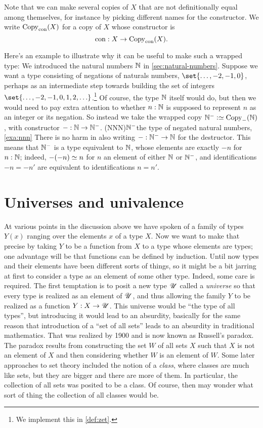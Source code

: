 Note that we can make several copies of $X$ that are not
definitionally equal among themselves,
for instance by picking different names for the constructor.
We write $\Copy_{\constructor{con}}(X)$ for a copy of $X$
whose constructor is
\[
  \constructor{con} : X \to \Copy_{\constructor{con}}(X).
\]

\begin{example}\label{exa:nnn}
Here's an example to illustrate why it can be useful to make such a wrapped type:
We introduced the natural numbers $\mathbb{N}$ in \cref{sec:natural-numbers}.
Suppose we want a type consisting of negations of naturals numbers,
$\set{\ldots, -2, -1,0}$,
perhaps as an intermediate step towards building the set of integers
$\set{\ldots, -2, -1,0,1,2,\ldots}$.\footnote{%
  We implement this in \cref{def:zet}.}
Of course, the type $\mathbb{N}$ itself would do,
but then we would need to pay extra attention to whether $n:\mathbb{N}$
is supposed to represent $n$ as an integer or its negation.
So instead we take the wrapped copy $\NNN\defeq\Copy_{-}(\NN)$,
with constructor ${-} : \mathbb{N} \to \mathbb{N}^{-}$.%
\glossary(NNN){$\protect\mathbb{N}^{-}$}{the type of negated natural numbers,
  \cref{exa:nnn}}
There is no harm in also writing ${-} : \mathbb{N}^{-} \to \mathbb{N}$
for the destructor.
This means that $\mathbb{N}^{-}$ is a type equivalent to $\mathbb{N}$,
whose elements are exactly $-n$ for $n:\mathbb{N}$;
indeed, $-(-n) \jdeq n$ for $n$ an element of either $\mathbb{N}$ or $\mathbb{N}^{-}$,
and identifications $-n = -n'$ are equivalent to
identifications $n=n'$.
\end{example}

\section{Universes and univalence}\label{sec:univax}

At various points in the discussion above we have spoken of a family of types $Y(x)$ ranging over the elements $x$ of a type $X$.  Now we want
to make that precise by taking $Y$ to be a function from $X$ to a type whose elements are types; one advantage will be that functions can be
defined by induction.  Until now types and their elements have been different sorts of things, so it might be a bit jarring at first to consider
a type as an element of some other type. Indeed, some care is required.  The first temptation is to posit a new type ${\mathscr{U}}$ called a \emph{universe} so that every type is realized as an element of ${\mathscr{U}}$, and thus allowing the family $Y$ to be realized as a function $Y : X \to
{\mathscr{U}}$.  This universe would be ``the type of all types'', but introducing it would lead to an absurdity, basically for the same reason that
introduction of a ``set of all sets'' leads to an absurdity in traditional mathematics.  That was realized by 1900 and is now known as Russell's
paradox.  The paradox results from constructing the set $W$ of all sets $X$ such that $X$ is not an element of $X$ and then considering whether
$W$ is an element of $W$.  Some later approaches to set theory included the notion of a \emph{class}, where classes are much like sets, but they
are bigger and there are more of them.  In particular, the collection of all sets was posited to be a class.  Of course, then may wonder what
sort of thing the collection of all classes would be.

